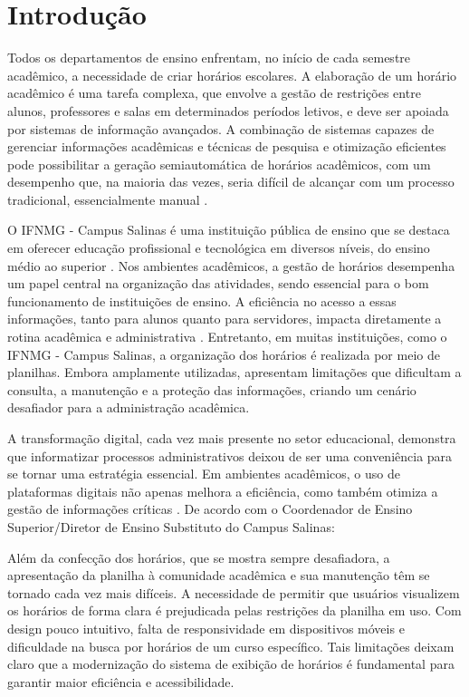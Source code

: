 \chapter{Introdução} 
\label{cap1_introducao} 

Todos os departamentos de ensino enfrentam, no início de cada semestre acadêmico, a necessidade de criar horários escolares. A elaboração de um horário acadêmico é uma tarefa complexa, que envolve a gestão de restrições entre alunos, professores e salas em determinados períodos letivos, e deve ser apoiada por sistemas de informação avançados. A combinação de sistemas capazes de gerenciar informações acadêmicas e técnicas de pesquisa e otimização eficientes pode possibilitar a geração semiautomática de horários acadêmicos, com um desempenho que, na maioria das vezes, seria difícil de alcançar com um processo tradicional, essencialmente manual \cite{passos2016}.

O IFNMG - Campus Salinas é uma instituição pública de ensino que se destaca em oferecer educação profissional e tecnológica em diversos níveis, do ensino médio ao superior \cite{ifnmgsalinas2014}. Nos ambientes acadêmicos, a gestão de horários desempenha um papel central na organização das atividades, sendo essencial para o bom funcionamento de instituições de ensino. A eficiência no acesso a essas informações, tanto para alunos quanto para servidores, impacta diretamente a rotina acadêmica e administrativa \cite{Urania2024}. Entretanto, em muitas instituições, como o IFNMG - Campus Salinas, a organização dos horários é realizada por meio de planilhas. Embora amplamente utilizadas, apresentam limitações que dificultam a consulta, a manutenção e a proteção das informações, criando um cenário desafiador para a administração acadêmica.

A transformação digital, cada vez mais presente no setor educacional, demonstra que informatizar processos administrativos deixou de ser uma conveniência para se tornar uma estratégia essencial. Em ambientes acadêmicos, o uso de plataformas digitais não apenas melhora a eficiência, como também otimiza a gestão de informações críticas \cite{Educacional2023}. De acordo com o Coordenador de Ensino Superior/Diretor de Ensino Substituto do Campus Salinas:

\begin{citacao}
Além da confecção dos horários, que se mostra sempre desafiadora, a apresentação da planilha à comunidade acadêmica e sua manutenção têm se tornado cada vez mais difíceis. A necessidade de permitir que usuários visualizem os horários de forma clara é prejudicada pelas restrições da planilha em uso. Com design pouco intuitivo, falta de responsividade em dispositivos móveis e dificuldade na busca por horários de um curso específico. Tais limitações deixam claro que a modernização do sistema de exibição de horários é fundamental para garantir maior eficiência e acessibilidade.
\end{citacao}

